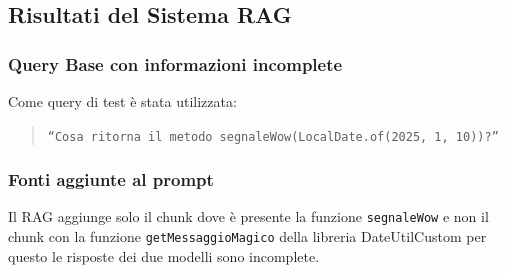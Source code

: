 \documentclass[12pt,a4paper,openright,twoside]{book}
\begin{document}
\subsection{Risultati del Sistema RAG}
\subsubsection{Query Base con informazioni incomplete}
Come query di test è stata utilizzata:
\begin{quote}
    \texttt{``Cosa ritorna il metodo segnaleWow(LocalDate.of(2025, 1, 10))?''}
\end{quote}
\subsubsection{Fonti aggiunte al prompt}
Il RAG aggiunge solo il chunk dove è presente la funzione \texttt{segnaleWow} e non il chunk con la funzione \texttt{getMessaggioMagico} della libreria DateUtilCustom
per questo le risposte dei due modelli sono incomplete.
\end{document}
